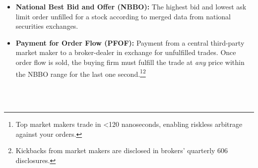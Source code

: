 \documentclass[11pt, english]{article}
\begin{document}
\begin{itemize}
  \item \textbf{National Best Bid and Offer (NBBO):} The highest bid and lowest ask limit order unfilled for a stock according to merged data from national securities exchanges.
  
  \item \textbf{Payment for Order Flow (PFOF):} Payment from a central third-party market maker to a broker-dealer in exchange for unfulfilled trades. Once order flow is sold, the buying firm must fulfill the trade at \textit{any} price within the NBBO range for the last one second.\footnote{Top market makers trade in <120 nanoseconds, enabling riskless arbitrage against your orders.}\footnote{Kickbacks from market makers are disclosed in brokers' quarterly 606 disclosures.}
\end{itemize}
\\\\
\end{document}
